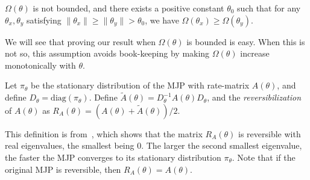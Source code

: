 \begin{assumption}
  $\Omega(\theta)$ is not bounded, and there exists a positive constant $\theta_0$ such 
  that for any $\theta_x, \theta_y$ satisfying
  $\| \theta_x \| \ge \| \theta_y \| > \theta_0$, we have $\Omega(\theta_x) \ge \Omega(\theta_y)$.  
  \label{asmp:mono_tail}
\end{assumption}
\noindent We will see that proving our result when $\Omega(\theta)$ is bounded is 
easy. %
When this is not so, this assumption avoids book-keeping by making 
$\Omega(\theta)$ increase monotonically with $\theta$.

\begin{definition}
Let $\pi_\theta$ be the stationary distribution of the MJP with rate-matrix 
$A(\theta)$, and define $D_\theta = \text{diag}(\pi_\theta)$. Define 
$\tilde{A}(\theta) = D_\theta^{-1}A(\theta)D_\theta$, and the 
{\em reversibilization} of $A(\theta)$ as $R_A(\theta) = 
(A(\theta)+\tilde{A}(\theta))/2$. 
\label{def:mjp_symm}
\end{definition}
This definition is from~\cite{fill1991}, which shows that the matrix 
$R_A(\theta)$ is reversible with real eigenvalues, the smallest being $0$. 
The larger the second smallest eigenvalue, the faster the MJP converges to its 
stationary distribution $\pi_\theta$.
Note that if the original MJP is reversible, then $R_A(\theta) = A(\theta)$.

